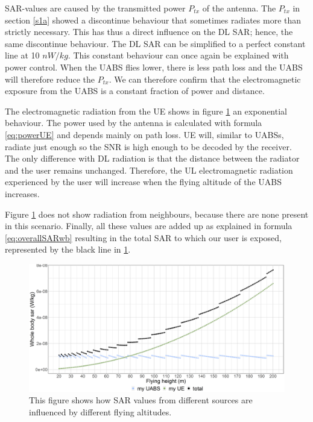 \gls{SAR}-values are caused by the transmitted power  $P_{tx}$ of the antenna. The $P_{tx}$ in section \ref{s1a}
showed a discontinue behaviour that sometimes radiates more than strictly necessary. This has thus a direct influence
on the \gls{DL} \gls{SAR}; hence, the same discontinue behaviour. The \gls{DL} \gls{SAR} can be simplified to a perfect constant line
at 10 $nW/kg$.
This constant behaviour can once again be explained with power control. When the \gls{UABS} flies lower, there is less path loss and the \gls{UABS} 
will therefore reduce the $P_{tx}$. 
We can therefore confirm that the electromagnetic exposure from the \gls{UABS} is a constant fraction of power and distance.

The electromagnetic radiation from the \gls{UE} shows in figure \ref{fig:s1_fhsar} an exponential behaviour. The power
used by the antenna is calculated with formula \ref{eq:powerUE}  and depends mainly on path loss.
\gls{UE} will, similar to \gls{UABS}s, radiate just enough so the \gls{SNR} is high enough to be decoded by the receiver.
The only difference with \gls{DL} radiation is that the distance between the radiator and the user remains unchanged. 
Therefore, the \gls{UL} electromagnetic radiation experienced by the user will increase when the flying altitude of the \gls{UABS} increases.


Figure \ref{fig:s1_fhsar} does not show radiation from neighbours, because there are none present in this scenario. 
Finally, all these values are added up as explained in formula \ref{eq:overallSARwb} resulting in the total \gls{SAR}
to which our user is exposed, represented by the black line in \ref{fig:s1_fhsar}.

\begin{figure}[]
\centering
  \includegraphics[width=\textwidth]{../results/s1/fhvssar.png}
  \caption{This figure shows how SAR values from different sources are influenced by different flying altitudes.}
  \label{fig:s1_fhsar}
\end{figure}

